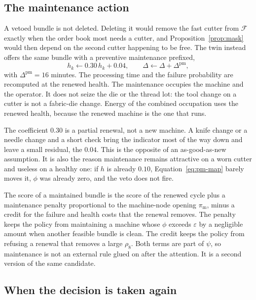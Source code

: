 \subsection{The maintenance action}

A vetoed bundle is not deleted. Deleting it would remove the fast cutter from \(\mathcal{F}\) exactly when the order book most needs a cutter, and Proposition~\ref{prop:mask} would then depend on the second cutter happening to be free. The twin instead offers the same bundle with a preventive maintenance prefixed,
\begin{equation}
h_k \leftarrow 0.30\, h_k + 0.04 , \qquad \Delta \leftarrow \Delta + \Delta^{\mathrm{pm}} ,
\label{eq:pm-map}
\end{equation}
with \(\Delta^{\mathrm{pm}} = 16\) minutes. The processing time and the failure probability are recomputed at the renewed health. The maintenance occupies the machine and the operator. It does not seize the die or the thread lot: the tool change on a cutter is not a fabric-die change. Energy of the combined occupation uses the renewed health, because the renewed machine is the one that runs.

The coefficient \(0.30\) is a partial renewal, not a new machine. A knife change or a needle change and a short check bring the indicator most of the way down and leave a small residual, the \(0.04\). This is the opposite of an as-good-as-new assumption. It is also the reason maintenance remains attractive on a worn cutter and useless on a healthy one: if \(h\) is already \(0.10\), Equation~\eqref{eq:pm-map} barely moves it, \(\phi\) was already zero, and the veto does not fire.

The score of a maintained bundle is the score of the renewed cycle plus a maintenance penalty proportional to the machine-node opening \(\pi_{\mathrm{m}}\), minus a credit for the failure and health costs that the renewal removes. The penalty keeps the policy from maintaining a machine whose \(\phi\) exceeds \(\varepsilon\) by a negligible amount when another feasible bundle is clean. The credit keeps the policy from refusing a renewal that removes a large \(\rho_8\). Both terms are part of \(\psi\), so maintenance is not an external rule glued on after the attention. It is a second version of the same candidate.

\subsection{When the decision is taken again}

